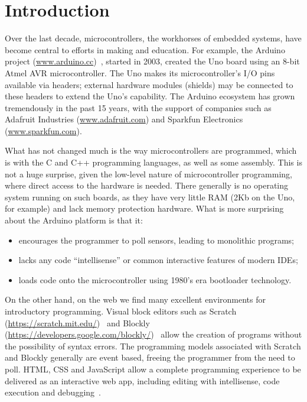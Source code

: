 \section{Introduction}
\label{sec:intro}

Over the last decade, microcontrollers, the workhorses of embedded systems, have become 
central to efforts in making and education. For example, the Arduino project 
(\url{www.arduino.cc})~\cite{buildingArduino2014}, 
started in 2003, created the Uno board using an 8-bit Atmel 
AVR microcontroller. The Uno makes its microcontroller's I/O pins available via headers;
external hardware modules (shields) may be connected to these headers to extend 
the Uno's capability. The Arduino ecosystem has grown tremendously in the past 15 years, 
with the support of companies such as Adafruit Industries (\url{www.adafruit.com}) and 
Sparkfun Electronics (\url{www.sparkfun.com}).

What has not changed much is the way microcontrollers are programmed,
which is with the C and C++ programming languages, as well as some assembly.   
This is not a huge surprise, given the low-level nature of microcontroller programming, 
where direct access to the hardware is needed. There generally is no operating 
system running on such boards, as they have very little RAM (2Kb on the Uno, for example) and 
lack memory protection hardware. What is more surprising about the Arduino platform is that
it:
\begin{itemize}
\item encourages the programmer to poll sensors, 
leading to monolithic programs;
\item lacks any code ``intellisense'' or common interactive features of modern IDEs;
\item loads code onto the microcontroller using 1980's era bootloader technology.
\end{itemize}
On the other hand, on the web we find many excellent environments for introductory programming. 
Visual block editors such as Scratch (\url{https://scratch.mit.edu/})~\cite{ScratchCACM2009,BlocksBeyondCACM2017} 
and Blockly (\url{https://developers.google.com/blockly/})~\cite{Blocky2015}
allow the creation of programs without the possibility of syntax errors. 
The programming models associated with Scratch and Blockly generally are 
event based, freeing the programmer from the need to poll.
HTML, CSS and JavaScript allow a complete programming experience to be delivered as an interactive 
web app, including editing with intellisense, code execution and debugging~\cite{Monaco}.


